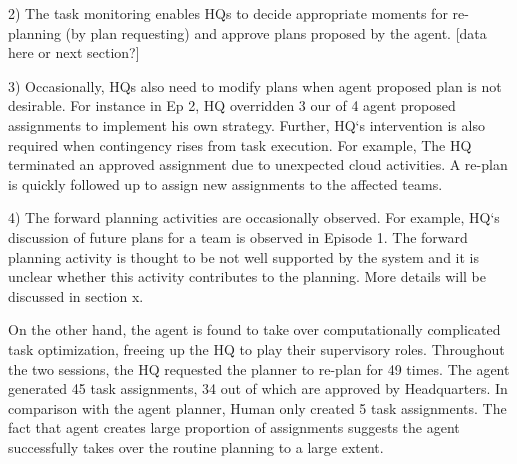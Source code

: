 2) The task monitoring enables HQs to decide appropriate moments for re-planning (by plan requesting) and approve plans proposed by the agent. [data here or next section?]

3) Occasionally, HQs also need to modify plans when agent proposed plan is not desirable. For instance in Ep 2, HQ overridden 3 our of 4 agent proposed assignments to implement his own strategy. Further, HQ`s intervention is also required when contingency rises from task execution. For example, The HQ terminated an approved assignment due to unexpected cloud activities. A re-plan is quickly followed up to assign new assignments to the affected teams. 

4) The forward planning activities are occasionally observed. For example, HQ`s discussion of future plans for a team is observed in Episode 1. The forward planning activity is thought to be not well supported by the system and it is unclear whether this activity contributes to the planning. More details will be discussed in section x. 

On the other hand, the agent is found to take over computationally complicated task optimization, freeing up the HQ to play their supervisory roles. Throughout the two sessions, the HQ requested the planner to re-plan for 49 times. The agent generated 45 task assignments, 34 out of which are approved by Headquarters. In comparison with the agent planner, Human only created 5 task assignments. The fact that agent creates large proportion of assignments suggests the agent successfully takes over the routine planning to a large extent. 

